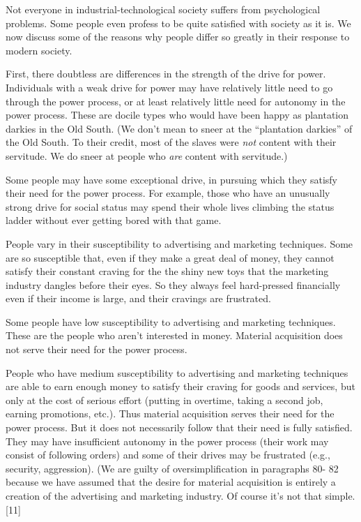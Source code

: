  Not everyone in industrial-technological society suffers from psychological problems. Some people even profess to be quite satisfied with society as it is. We now discuss some of the reasons why people differ so greatly in their response to modern society.

 First, there doubtless are differences in the strength of the drive for power. Individuals with a weak drive for power may have relatively little need to go through the power process, or at least relatively little need for autonomy in the power process. These are docile types who would have been happy as plantation darkies in the Old South. (We don’t mean to sneer at the “plantation darkies” of the Old South. To their credit, most of the slaves were {\em not} content with their servitude. We do sneer at people who {\em are} content with servitude.)

 Some people may have some exceptional drive, in pursuing which they satisfy their need for the power process. For example, those who have an unusually strong drive for social status may spend their whole lives climbing the status ladder without ever getting bored with that game.

 People vary in their susceptibility to advertising and marketing techniques. Some are so susceptible that, even if they make a great deal of money, they cannot satisfy their constant craving for the the shiny new toys that the marketing industry dangles before their eyes. So they always feel hard-pressed financially even if their income is large, and their cravings are frustrated.

 Some people have low susceptibility to advertising and marketing techniques. These are the people who aren’t interested in money. Material acquisition does not serve their need for the power process.

 People who have medium susceptibility to advertising and marketing techniques are able to earn enough money to satisfy their craving for goods and services, but only at the cost of serious effort (putting in overtime, taking a second job, earning promotions, etc.). Thus material acquisition serves their need for the power process. But it does not necessarily follow that their need is fully satisfied. They may have insufficient autonomy in the power process (their work may consist of following orders) and some of their drives may be frustrated (e.g., security, aggression). (We are guilty of oversimplification in paragraphs 80- 82 because we have assumed that the desire for material acquisition is entirely a creation of the advertising and marketing industry. Of course it’s not that simple. [11]

